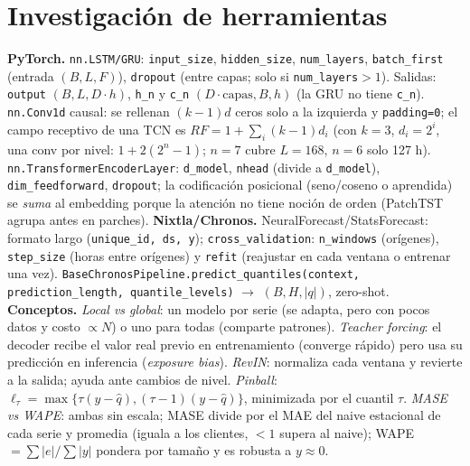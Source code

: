 \documentclass[10pt,letterpaper]{extarticle}
\begin{document}
\section{Investigación de herramientas}\footnotesize
\textbf{PyTorch.} \texttt{nn.LSTM/GRU}: \texttt{input\_size}, \texttt{hidden\_size}, \texttt{num\_layers}, \texttt{batch\_first} (entrada $(B,L,F)$), \texttt{dropout} (entre capas; solo si
\texttt{num\_layers}$>1$). Salidas: \texttt{output} $(B,L,D\!\cdot\!h)$, \texttt{h\_n} y \texttt{c\_n} $(D\!\cdot\!\text{capas},B,h)$ (la GRU no tiene \texttt{c\_n}).
\texttt{nn.Conv1d} causal: se rellenan $(k-1)d$ ceros solo a la izquierda y \texttt{padding=0}; el campo receptivo de una TCN es $RF=1+\sum_i(k-1)d_i$
(con $k=3$, $d_i=2^i$, una conv por nivel: $1+2(2^n-1)$; $n=7$ cubre $L=168$, $n=6$ solo 127 h).
\texttt{nn.TransformerEncoderLayer}: \texttt{d\_model}, \texttt{nhead} (divide a \texttt{d\_model}), \texttt{dim\_feedforward}, \texttt{dropout}; la codificación posicional (seno/coseno o aprendida) se \emph{suma} al embedding
porque la atención no tiene noción de orden (PatchTST agrupa antes en parches).
\textbf{Nixtla/Chronos.} NeuralForecast/StatsForecast: formato largo (\texttt{unique\_id, ds, y}); \texttt{cross\_validation}: \texttt{n\_windows} (orígenes), \texttt{step\_size} (horas entre orígenes)
y \texttt{refit} (reajustar en cada ventana o entrenar una vez). \texttt{BaseChronosPipeline.predict\_quantiles(context, prediction\_length, quantile\_levels)} $\to$ $(B,H,|q|)$, zero-shot.
\textbf{Conceptos.} \emph{Local vs global}: un modelo por serie (se adapta, pero con pocos datos y costo $\propto N$) o uno para todas (comparte patrones). \emph{Teacher forcing}: el decoder recibe el valor real previo
en entrenamiento (converge rápido) pero usa su predicción en inferencia (\emph{exposure bias}). \emph{RevIN}: normaliza cada ventana y revierte a la salida; ayuda ante cambios de nivel.
\emph{Pinball}: $\ell_\tau=\max\{\tau(y-\hat q),(\tau-1)(y-\hat q)\}$, minimizada por el cuantil $\tau$. \emph{MASE vs WAPE}: ambas sin escala; MASE divide por el MAE del naive estacional de cada serie y promedia (iguala a los clientes, $<1$ supera al naive);
WAPE$=\sum|e|/\sum|y|$ pondera por tamaño y es robusta a $y\approx0$.\normalsize
\end{document}
